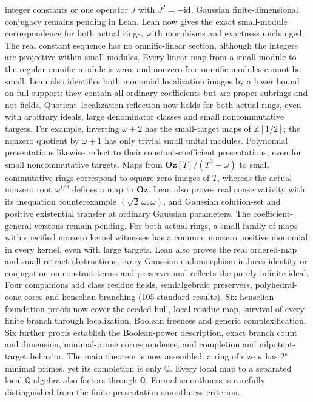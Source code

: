 \documentclass[11pt]{article}
\newcommand{\Q}{\mathbb{Q}}
\newcommand{\Oz}{\mathbf{Oz}}
\newcommand{\Z}{\mathbb{Z}}
\begin{document}
{integer constants or one operator $J$ with $J^2=-\mathrm{id}$.
Gaussian finite-dimensional conjugacy remains pending in Lean.
Lean now gives the exact small-module correspondence for both actual rings,
with morphisms and exactness unchanged. The real constant sequence has no
omnific-linear section, although the integers are projective within small
modules. Every linear map from a small module to the regular omnific module
is zero, and nonzero free omnific modules cannot be small.
Lean also identifies both monomial localization images by a lower bound
on full support: they contain all ordinary coefficients but are proper
subrings and not fields. Quotient--localization reflection now holds for
both actual rings, even with arbitrary ideals, large denominator classes
and small noncommutative targets. For example, inverting $\omega+2$ has
the small-target maps of $\Z[1/2]$; the nonzero quotient by $\omega+1$
has only trivial small unital modules. Polynomial presentations likewise
reflect to their constant-coefficient presentations, even for small
noncommutative targets. Maps from $\Oz[T]/(T^2-\omega)$ to small
commutative rings correspond to square-zero images of $T$, whereas the
actual nonzero root $\omega^{1/2}$ defines a map to $\Oz$.
Lean also proves real conservativity with its inequation counterexample
$(\sqrt2\,\omega,\omega)$, and Gaussian solution-set and positive
existential transfer at ordinary Gaussian parameters.
The coefficient-general versions remain pending.
For both actual rings, a small family of maps with specified nonzero
kernel witnesses has a common nonzero positive monomial in every kernel,
even with large targets. Lean also proves the real ordered-map and
small-retract obstructions; every Gaussian endomorphism induces identity
or conjugation on constant terms and preserves and reflects the purely
infinite ideal.
Four companions add class residue fields, semialgebraic preservers,
polyhedral-cone cores and henselian branching (105 standard results).
Six henselian foundation proofs now cover the seeded hull, local residue
map, survival of every finite branch through localization, Boolean
freeness and generic complexification. Six further proofs establish the
Boolean-power description, exact branch count and dimension, minimal-prime
correspondence, and completion and nilpotent-target behavior. The main
theorem is now assembled: a ring of size $\kappa$ has $2^\kappa$ minimal
primes, yet its completion is only $\Q$. Every local map to a separated
local $\Q$-algebra also factors through $\Q$. Formal smoothness is
carefully distinguished from the finite-presentation smoothness criterion.
}
\end{document}
